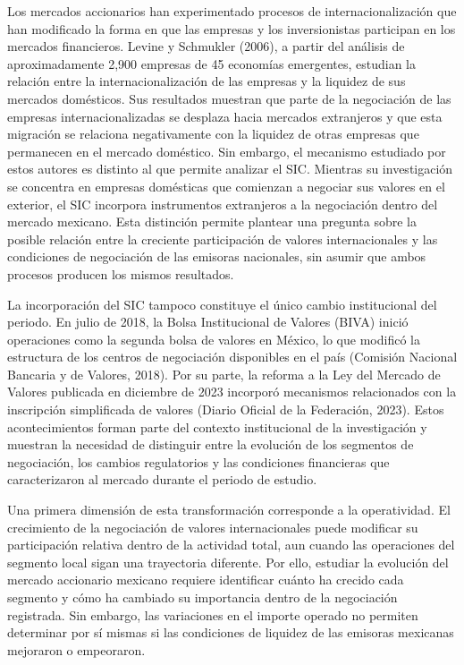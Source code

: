 Los mercados accionarios han experimentado procesos de internacionalización que han modificado la forma en que las empresas y los inversionistas participan en los mercados financieros. Levine y Schmukler (2006), a partir del análisis de aproximadamente 2,900 empresas de 45 economías emergentes, estudian la relación entre la internacionalización de las empresas y la liquidez de sus mercados domésticos. Sus resultados muestran que parte de la negociación de las empresas internacionalizadas se desplaza hacia mercados extranjeros y que esta migración se relaciona negativamente con la liquidez de otras empresas que permanecen en el mercado doméstico. Sin embargo, el mecanismo estudiado por estos autores es distinto al que permite analizar el SIC. Mientras su investigación se concentra en empresas domésticas que comienzan a negociar sus valores en el exterior, el SIC incorpora instrumentos extranjeros a la negociación dentro del mercado mexicano. Esta distinción permite plantear una pregunta sobre la posible relación entre la creciente participación de valores internacionales y las condiciones de negociación de las emisoras nacionales, sin asumir que ambos procesos producen los mismos resultados.

La incorporación del SIC tampoco constituye el único cambio institucional del periodo. En julio de 2018, la Bolsa Institucional de Valores (BIVA) inició operaciones como la segunda bolsa de valores en México, lo que modificó la estructura de los centros de negociación disponibles en el país (Comisión Nacional Bancaria y de Valores, 2018). Por su parte, la reforma a la Ley del Mercado de Valores publicada en diciembre de 2023 incorporó mecanismos relacionados con la inscripción simplificada de valores (Diario Oficial de la Federación, 2023). Estos acontecimientos forman parte del contexto institucional de la investigación y muestran la necesidad de distinguir entre la evolución de los segmentos de negociación, los cambios regulatorios y las condiciones financieras que caracterizaron al mercado durante el periodo de estudio.

Una primera dimensión de esta transformación corresponde a la operatividad. El crecimiento de la negociación de valores internacionales puede modificar su participación relativa dentro de la actividad total, aun cuando las operaciones del segmento local sigan una trayectoria diferente. Por ello, estudiar la evolución del mercado accionario mexicano requiere identificar cuánto ha crecido cada segmento y cómo ha cambiado su importancia dentro de la negociación registrada. Sin embargo, las variaciones en el importe operado no permiten determinar por sí mismas si las condiciones de liquidez de las emisoras mexicanas mejoraron o empeoraron.


